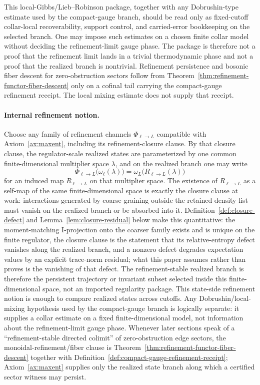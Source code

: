 \documentclass[11pt]{article}
\begin{document}
This local-Gibbs/Lieb--Robinson package, together with any Dobrushin-type estimate used by the compact-gauge branch, should be read only as fixed-cutoff collar-local recoverability, support control, and carried-error bookkeeping on the selected branch. One may impose such estimates on a chosen finite collar model without deciding the refinement-limit gauge phase. The package is therefore not a proof that the refinement limit lands in a trivial thermodynamic phase and not a proof that the realized branch is nontrivial. Refinement persistence and bosonic fiber descent for zero-obstruction sectors follow from Theorem~\ref{thm:refinement-functor-fiber-descent} only on a cofinal tail carrying the compact-gauge refinement receipt. The local mixing estimate does not supply that receipt.

\paragraph{Internal refinement notion.}
Choose any family of refinement channels \(\Phi_{\ell\to L}\) compatible with Axiom~\ref{ax:maxent}, including its refinement-closure clause. By that closure clause, the regulator-scale realized states are parameterized by one common finite-dimensional multiplier space \(\lambda\), and on the realized branch one may write
\[
\Phi_{\ell\to L}\bigl(\omega_{\ell}(\lambda)\bigr)
=
\omega_{L}\!\bigl(R_{\ell\to L}(\lambda)\bigr)
\]
for an induced map \(R_{\ell\to L}\) on that multiplier space. The existence of \(R_{\ell\to L}\) as a self-map of the same finite-dimensional space is exactly the closure clause at work: interactions generated by coarse-graining outside the retained density list must vanish on the realized branch or be absorbed into it. Definition~\ref{def:closure-defect} and Lemma~\ref{lem:closure-residual} below make this quantitative: the moment-matching I-projection onto the coarser family exists and is unique on the finite regulator, the closure clause is the statement that its relative-entropy defect vanishes along the realized branch, and a nonzero defect degrades expectation values by an explicit trace-norm residual; what this paper assumes rather than proves is the vanishing of that defect. The refinement-stable realized branch is therefore the persistent trajectory or invariant subset selected inside this finite-dimensional space, not an imported regularity package. This state-side refinement notion is enough to compare realized states across cutoffs. Any Dobrushin/local-mixing hypothesis used by the compact-gauge branch is logically separate: it supplies a collar estimate on a fixed finite-dimensional model, not information about the refinement-limit gauge phase. Whenever later sections speak of a ``refinement-stable directed colimit'' of zero-obstruction edge sectors, the monoidal-refinement/fiber clause is Theorem~\ref{thm:refinement-functor-fiber-descent} together with Definition~\ref{def:compact-gauge-refinement-receipt}; Axiom~\ref{ax:maxent} supplies only the realized state branch along which a certified sector witness may persist.
\end{document}
